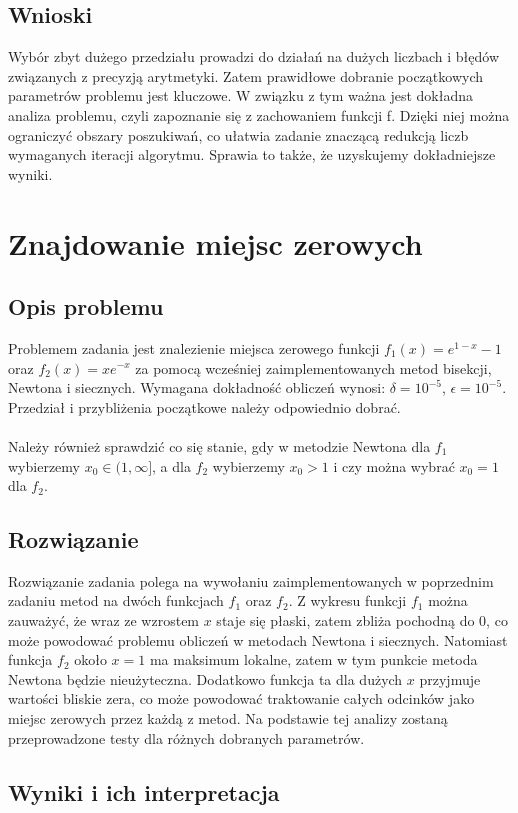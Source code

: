 \documentclass{article}
\begin{document}
\subsection{Wnioski}
Wybór zbyt dużego przedziału prowadzi do działań na dużych liczbach i błędów związanych z precyzją arytmetyki. Zatem prawidłowe dobranie początkowych parametrów problemu jest kluczowe. W związku z tym ważna jest dokładna analiza problemu, czyli zapoznanie się z zachowaniem funkcji f. Dzięki niej można ograniczyć obszary poszukiwań, co ułatwia zadanie znaczącą redukcją liczb wymaganych iteracji algorytmu. Sprawia to także, że uzyskujemy dokładniejsze wyniki. 
\section{Znajdowanie miejsc zerowych}
\subsection{Opis problemu}
Problemem zadania jest znalezienie miejsca zerowego funkcji $f_1(x) = e^{1-x} - 1$ oraz $f_2(x) = xe^{-x}$ za pomocą wcześniej zaimplementowanych metod bisekcji, Newtona i siecznych. Wymagana dokładność obliczeń wynosi: $\delta = 10^{-5}$, $\epsilon = 10^{-5}$. Przedział i przybliżenia początkowe należy odpowiednio dobrać. 
\\ \\ Należy również sprawdzić co się stanie, gdy w metodzie Newtona dla $f_1$ wybierzemy $x_0 \in (1, \infty]$, a dla $f_2$ wybierzemy $x_0 > 1$ i czy można wybrać $x_0 = 1$ dla $f_2$. 
\subsection{Rozwiązanie}
Rozwiązanie zadania polega na wywołaniu zaimplementowanych w poprzednim zadaniu metod na dwóch funkcjach $f_1$ oraz $f_2$. Z wykresu funkcji $f_1$ można zauważyć, że wraz ze wzrostem $x$ staje się płaski, zatem zbliża pochodną do 0, co może powodować problemu obliczeń w metodach Newtona i siecznych. Natomiast funkcja $f_2$ około $x = 1$ ma maksimum lokalne, zatem w tym punkcie metoda Newtona będzie nieużyteczna. Dodatkowo funkcja ta dla dużych $x$ przyjmuje wartości bliskie zera, co może powodować traktowanie całych odcinków jako miejsc zerowych przez każdą z metod. Na podstawie tej analizy zostaną przeprowadzone testy dla różnych  dobranych parametrów. 
\subsection{Wyniki i ich interpretacja}
\end{document}
